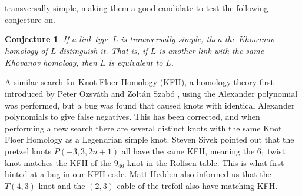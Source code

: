 \documentclass{article}
\theoremstyle{plain}
\newtheorem{conjecture}{Conjecture}
\begin{document}
        transversally simple, making them a good candidate to test the following
        conjecture on.
        \begin{conjecture}
            If a link type $L$ is transversally simple, then the Khovanov
            homology of $L$ distinguish it. That is, if $\tilde{L}$
            is another link with the same Khovanov homology, then $\tilde{L}$ is
            equivalent to $L$.
        \end{conjecture}
        A similar search for Knot Floer Homology (KFH), a homology theory
        first introduced by Peter Ozsv\'{a}th and Zolt\'{a}n Szab\'{o}
        \cite{ozsvathszabo2004}, using the Alexander polynomial
        was performed, but a bug was found that caused knots with identical
        Alexander polynomials to give false negatives. This has been corrected,
        and when performing a new search there are several distinct knots
        with the same Knot Floer Homology as a Legendrian simple knot. Steven
        Sivek pointed
        out that the pretzel knots $P(-3,3,2n+1)$ all have the same KFH, meaning
        the $6_{1}$ twist knot matches the KFH of the $9_{46}$ knot in the
        Rolfsen table. This is what first hinted at a bug in our KFH code.
        Matt Hedden also informed us that the $T(4,3)$ knot and the
        $(2,3)$ cable of the trefoil also have matching KFH.
\end{document}
